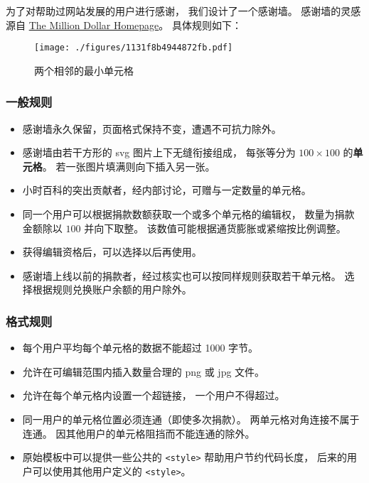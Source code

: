 
\begin{issues}
\issueDraft
{}
\end{issues}

为了对帮助过网站发展的用户进行感谢， 我们设计了一个感谢墙。 感谢墙的灵感源自 \href{https://en.wikipedia.org/wiki/The_Million_Dollar_Homepage}{The Million Dollar Homepage}。 具体规则如下：

\begin{figure}[ht]
\centering
\texttt{[image: ./figures/1131f8b4944872fb.pdf]}
\caption{两个相邻的最小单元格} \label{fig_thanks_1}
\end{figure}

\subsubsection{一般规则}
\begin{itemize}
\item 感谢墙永久保留，页面格式保持不变，遭遇不可抗力除外。
\item 感谢墙由若干方形的 svg 图片上下无缝衔接组成， 每张等分为 $100\times 100$ 的\textbf{单元格}。 若一张图片填满则向下插入另一张。
\item 小时百科的突出贡献者，经内部讨论，可赠与一定数量的单元格。
\item 同一个用户可以根据捐款数额获取一个或多个单元格的编辑权， 数量为捐款金额除以 $100$ 并向下取整。 该数值可能根据通货膨胀或紧缩按比例调整。
\item 获得编辑资格后，可以选择以后再使用。
\item 感谢墙上线以前的捐款者，经过核实也可以按同样规则获取若干单元格。 选择根据规则兑换账户余额的用户除外。
\end{itemize}

\subsubsection{格式规则}
\begin{itemize}
\item 每个用户平均每个单元格的数据不能超过 1000 字节。
\item 允许在可编辑范围内插入数量合理的 png 或 jpg 文件。
\item 允许在每个单元格内设置一个超链接， 一个用户不得超过。
\item 同一用户的单元格位置必须连通（即使多次捐款）。 两单元格对角连接不属于连通。 因其他用户的单元格阻挡而不能连通的除外。
\item 原始模板中可以提供一些公共的 \verb`<style>` 帮助用户节约代码长度， 后来的用户可以使用其他用户定义的 \verb`<style>`。
\end{itemize}

